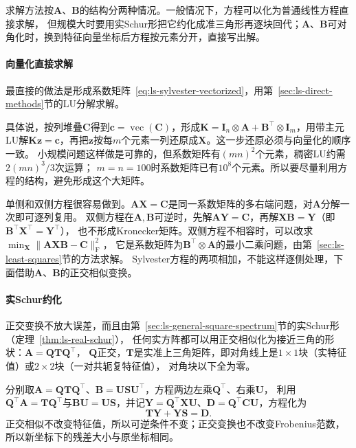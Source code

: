 求解方法按$\bm A$、$\bm B$的结构分两种情况。一般情况下，方程可以化为普通线性方程直接求解，
但规模大时要用实Schur形把它约化成准三角形再逐块回代；$\bm A$、$\bm B$可对角化时，换到特征向量坐标后方程按元素分开，直接写出解。

\label{sec:ls-one-sided-two-sided}

\paragraph{向量化直接求解}

最直接的做法是形成系数矩阵~\eqref{eq:ls-sylvester-vectorized}，用第~\ref{sec:ls-direct-methods}节的LU分解求解。

具体说，按列堆叠$\bm C$得到$\bm c=\operatorname{vec}(\bm C)$，形成$\bm K=\bm I_n\otimes\bm A+\bm B^\top\otimes\bm I_m$，用带主元LU解$\bm K\bm z=\bm c$，再把$\bm z$按每$m$个元素一列还原成$\bm X$。这一步还原必须与向量化的顺序一致。
小规模问题这样做是可靠的，但系数矩阵有$(mn)^2$个元素，稠密LU约需$2(mn)^3/3$次运算；
$m=n=100$时系数矩阵已有$10^8$个元素。所以要尽量利用方程的结构，避免形成这个大矩阵。

单侧和双侧方程很容易做到。$\bm A\bm X=\bm C$是同一系数矩阵的多右端问题，对$\bm A$分解一次即可逐列复用。
双侧方程在$\bm A,\bm B$可逆时，先解$\bm A\bm Y=\bm C$，再解$\bm X\bm B=\bm Y$（即$\bm B^\top\bm X^\top=\bm Y^\top$），
也不形成Kronecker矩阵。双侧方程不相容时，可以改求$\min_{\bm X}\lVert\bm A\bm X\bm B-\bm C\rVert_{\mathrm F}^2$，
它是系数矩阵为$\bm B^\top\otimes\bm A$的最小二乘问题，由第~\ref{sec:ls-least-squares}节的方法求解。
Sylvester方程的两项相加，不能这样逐侧处理，下面借助$\bm A$、$\bm B$的正交相似变换。

\paragraph{实Schur约化}
\label{sec:ls-sylvester-schur}

正交变换不放大误差，而且由第~\ref{sec:ls-general-square-spectrum}节的实Schur形（定理~\ref{thm:ls-real-schur}），
任何实方阵都可以用正交相似化为接近三角的形状：$\bm A=\bm Q\bm T\bm Q^\top$，
$\bm Q$正交，$\bm T$是实准上三角矩阵，即对角线上是$1\times1$块（实特征值）或$2\times2$块（一对共轭复特征值），
对角块以下全为零。

分别取$\bm A=\bm Q\bm T\bm Q^\top$、$\bm B=\bm U\bm S\bm U^\top$，方程两边左乘$\bm Q^\top$、右乘$\bm U$，
利用$\bm Q^\top\bm A=\bm T\bm Q^\top$与$\bm B\bm U=\bm U\bm S$，并记$\bm Y=\bm Q^\top\bm X\bm U$、$\bm D=\bm Q^\top\bm C\bm U$，方程化为
\begin{equation}
 \bm T\bm Y+\bm Y\bm S=\bm D.
 \label{eq:ls-sylvester-transformed}
\end{equation}
正交相似不改变特征值，所以可逆条件不变；正交变换也不改变Frobenius范数，所以新坐标下的残差大小与原坐标相同。

